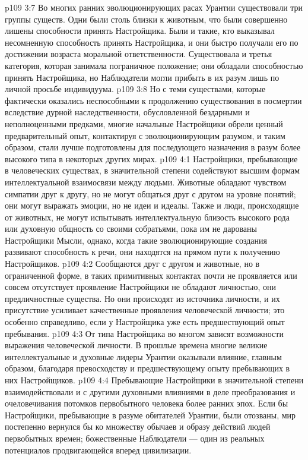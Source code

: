 \vs p109 3:7 \pc Во многих ранних эволюционирующих расах Урантии существовали три группы существ. Одни были столь близки к животным, что были совершенно лишены способности принять Настройщика. Были и такие, кто выказывал несомненную способность принять Настройщика, и они быстро получали его по достижении возраста моральной ответственности. Существовала и третья категория, которая занимала пограничное положение; они обладали способностью принять Настройщика, но Наблюдатели могли прибыть в их разум лишь по личной просьбе индивидуума.
\vs p109 3:8 Но с теми существами, которые фактически оказались неспособными к продолжению существования в посмертии вследствие дурной наследственности, обусловленной бездарными и неполноценными предками, многие начальные Настройщики обрели ценный предварительный опыт, контактируя с эволюционирующим разумом, и таким образом, стали лучше подготовлены для последующего назначения в разум более высокого типа в некоторых других мирах.
\vs p109 4:1 Настройщики, пребывающие в человеческих существах, в значительной степени содействуют высшим формам интеллектуальной взаимосвязи между людьми. Животные обладают чувством симпатии друг к другу, но не могут общаться друг с другом на уровне понятий; они могут выражать эмоции, но не идеи и идеалы. Также и люди, происходящие от животных, не могут испытывать интеллектуальную близость высокого рода или духовную общность со своими собратьями, пока им не дарованы Настройщики Мысли, однако, когда такие эволюционирующие создания развивают способность к речи, они находятся на прямом пути к получению Настройщиков.
\vs p109 4:2 Сообщаются друг с другом и животные, но в ограниченной форме, в таких примитивных контактах почти не проявляется или совсем отсутствует проявление  Настройщики не обладают личностью, они предличностные существа. Но они происходят из источника личности, и их присутствие усиливает качественные проявления человеческой личности; это особенно справедливо, если у Настройщика уже есть предшествующий опыт пребывания.
\vs p109 4:3 От типа Настройщика во многом зависят возможности выражения человеческой личности. В прошлые времена многие великие интеллектуальные и духовные лидеры Урантии оказывали влияние, главным образом, благодаря превосходству и предшествующему опыту пребывающих в них Настройщиков.
\vs p109 4:4 Пребывающие Настройщики в значительной степени взаимодействовали и с другими духовными влияниями в деле преобразования и очеловечивания потомков первобытного человека более ранних эпох. Если бы Настройщики, пребывающие в разуме обитателей Урантии, были отозваны, мир постепенно вернулся бы ко множеству обычаев и образу действий людей первобытных времен; божественные Наблюдатели --- один из реальных потенциалов продвигающейся вперед цивилизации.
